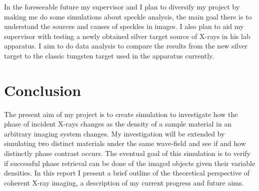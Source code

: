 \documentclass[9pt, a4paper]{article}
\begin{document}
In the foreseeable future my supervisor and I plan to diversify my project by making me do some simulations about speckle analysis, the main goal there is to understand the sources and causes of speckles in images.
I also plan to aid my supervisor with testing a newly obtained silver target source of X-rays in his lab apparatus. I aim to do data analysis to compare the results from the new silver target to the classic tungsten target used in the apparatus currently.

\section{Conclusion}
The present aim of my project is to create simulation to investigate how the phase of incident X-rays changes as the density of a sample material in an arbitrary imaging system changes. My investigation will be extended by simulating two distinct materials under the same wave-field and see if and how distinctly phase contrast occurs. The eventual goal of this simulation is to verify if successful phase retrieval can be done of the imaged objects given their variable densities. In this report I present a brief outline of the theoretical perspective of coherent X-ray imaging, a description of my current progress and future aims.



\end{document}
